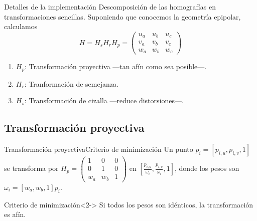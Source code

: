 \documentclass[aspectratio=169,14pt,spanish]{beamer}
\begin{document}
    \begin{frame}{Detalles de la implementación}{}
      Descomposición de las homografías en transformaciones sencillas.
      Suponiendo que conocemos la geometría epipolar, calculamos
      \[
      H = H_s H_r H_p =
      \begin{pmatrix}
          u_a & u_b & u_c \\
          v_a & v_b & v_c \\
          w_a & w_b & w_c
      \end{pmatrix}
      \]

        \begin{enumerate}
            \item<2-> $H_p$: Transformación proyectiva ---tan afín como sea posible---.
            \item<3-> $H_r$: Tranformación de semejanza.
            \item<4-> $H_s$: Transformación de cizalla ---reduce distorsiones---.
        \end{enumerate}
    \end{frame}

    \subsection{Transformación proyectiva}


      \begin{frame}{Transformación proyectiva}{Criterio de minimización}
          Un punto $p_i = [p_{i,u}, p_{i,v}, 1]$ se transforma por
          $
          H_p =
          \begin{pmatrix}
              1 & 0 & 0 \\
              0 & 1 & 0 \\
              w_a & w_b & 1
          \end{pmatrix}
          $
          en $[\frac{p_{i,u}}{\omega_i}, \frac{p_{i,v}}{\omega_i}, 1]$, donde los pesos son $\omega_i = [w_a, w_b, 1]p_i$.
          \\
          \begin{alertblock}{Criterio de minimización}<2->
              Si todos los pesos son idénticos, la transformación es afín.
          \end{alertblock}
      \end{frame}
\end{document}
